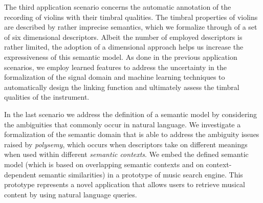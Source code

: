 The third application scenario concerns the automatic annotation of the recording of violins with their timbral qualities. The timbral properties of violins are described by rather imprecise semantics, which we formalize through of a set of six dimensional descriptors. Albeit the number of employed descriptors is rather limited, the adoption of a dimensional approach helps us increase the expressiveness of this semantic model. As done in the previous application scenarios, we employ learned features to address the uncertainty in the formalization of the signal domain and  machine learning techniques to automatically design the linking function and ultimately assess the timbral qualities of the instrument.

In the last scenario we address the definition of a semantic model by considering the ambiguities that commonly occur in natural language. We investigate a formalization of the semantic domain that is able to address the ambiguity issues raised by \textit{polysemy}, which occurs when descriptors take on different meanings when used within different \textit{semantic contexts}. We embed the defined semantic model (which is based on overlapping semantic contexts and on context-dependent semantic similarities) in a prototype of music search engine. This prototype represents a novel application that allows users to retrieve musical content by using natural language queries.
